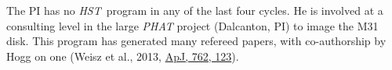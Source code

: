\documentclass[12pt]{article}
\newcommand{\project}[1]{\textsl{#1}}
\newcommand{\HST}{\project{HST}}
\begin{document}
The PI has no \HST\ program in any of the last four cycles.  He is
involved at a consulting level in the large \project{PHAT} project
(Dalcanton, PI) to image the M31 disk.  This program has generated
many refereed papers, with co-authorship by Hogg on one (Weisz et al.,
2013, \href{http://dx.doi.org/10.1088/0004-637X/762/2/123}{ApJ, 762, 123}).
%
%




\end{document}
